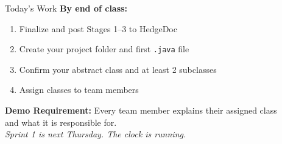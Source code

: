 \documentclass{beamer}
\begin{document}
\begin{frame}{Today's Work}
\textbf{By end of class:}
\vspace{0.2cm}
\begin{enumerate}
  \item Finalize and post Stages 1--3 to HedgeDoc
  \item Create your project folder and first \texttt{.java} file
  \item Confirm your abstract class and at least 2 subclasses
  \item Assign classes to team members
\end{enumerate}
\vspace{0.3cm}
\textbf{Demo Requirement:} Every team member explains their assigned class\\
and what it is responsible for.\\
\vspace{0.3cm}
\textit{Sprint 1 is next Thursday. The clock is running.}
\end{frame}
\end{document}
